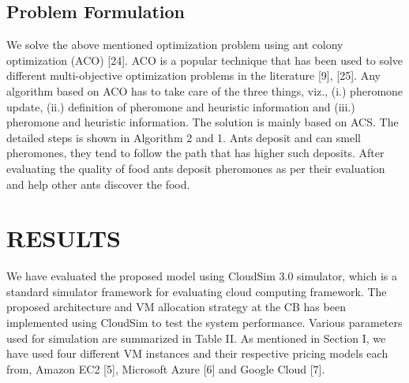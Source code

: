 \documentclass[conference]{IEEEtran}
\begin{document}
\subsection{Problem Formulation}
We solve the above mentioned optimization problem using ant colony optimization (ACO) [24]. ACO is a popular
technique that has been used to solve different multi-objective
optimization problems in the literature [9], [25]. Any algorithm
based on ACO has to take care of the three things, viz., (i.)
pheromone update, (ii.) definition of pheromone and heuristic
information and (iii.) pheromone and heuristic information.
The solution is mainly based on ACS. The detailed steps is
shown in Algorithm 2 and 1. Ants deposit and can smell
pheromones, they tend to follow the path that has higher
such deposits. After evaluating the quality of food ants deposit pheromones as per their evaluation and help other ants
discover the food.


\section{RESULTS}
We have evaluated the proposed model using CloudSim
3.0 simulator, which is a standard simulator framework for
evaluating cloud computing framework. The proposed architecture and VM allocation strategy at the CB has been
implemented using CloudSim to test the system performance.
Various parameters used for simulation are summarized in
Table II. As mentioned in Section I, we have used four different VM instances and their respective pricing models
each from, Amazon EC2 [5], Microsoft Azure [6] and Google
Cloud [7].
\end{document}
